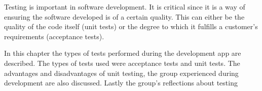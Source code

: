 Testing is important in software development. It is critical since it is a way of ensuring the software developed is of a certain quality. This can either be the quality of the code itself (unit tests) or the degree to which it fulfills a customer's requirements (acceptance tests).  

In this chapter the types of tests performed during the development app are described. The types of tests used were acceptance tests and unit tests. The advantages and disadvantages of unit testing, the group experienced during development are also discussed. Lastly the group's reflections about testing 